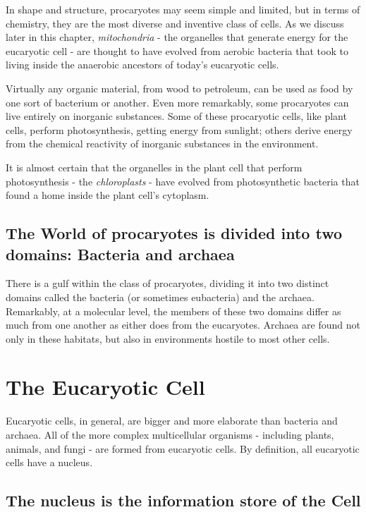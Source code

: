 In shape and structure, procaryotes may seem simple and limited,
but in terms of chemistry, they are the most diverse and inventive class
of cells.
As we discuss later in this chapter, \textit{mitochondria} - the organelles that
generate energy for the eucaryotic cell - are thought to have evolved from
aerobic bacteria that took to living inside the anaerobic ancestors of
today’s eucaryotic cells.

Virtually any organic material, from wood to petroleum, can be used as
food by one sort of bacterium or another. Even more remarkably, some
procaryotes can live entirely on inorganic substances.
Some of these procaryotic cells, like plant cells, perform photosynthesis,
getting energy from sunlight; others derive energy from the chemical
reactivity of inorganic substances in the environment.

It is almost certain that the organelles in the plant cell that
perform photosynthesis - the \textit{chloroplasts} - have evolved from photosynthetic
bacteria that found a home inside the plant cell’s cytoplasm.

\subsection{The World of procaryotes is divided into two domains: Bacteria and archaea}

There is a gulf within the class of procaryotes, dividing it into two distinct
domains called the bacteria (or sometimes eubacteria) and the archaea.
Remarkably, at a molecular level, the members of these two domains differ as
much from one another as either does from the eucaryotes.
Archaea are found not only in these habitats, but also
in environments hostile to most other cells.

\section{The Eucaryotic Cell}

Eucaryotic cells, in general, are bigger and more elaborate than bacteria
and archaea. All of the more complex multicellular organisms - including
plants, animals, and fungi - are formed from eucaryotic cells.
By definition, all eucaryotic cells have a nucleus.

\subsection{The nucleus is the information store of the Cell}

